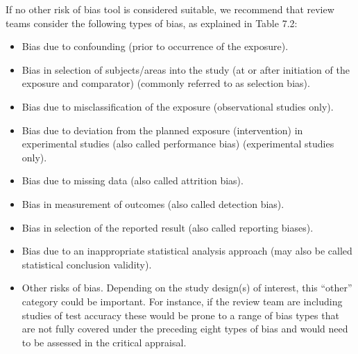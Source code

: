 \documentclass[
  letterpaper,
  DIV=11,
  numbers=noendperiod]{scrreprt}
\begin{document}
If no other risk of bias tool is considered suitable, we recommend that
review teams consider the following types of bias, as explained in Table
7.2:

\begin{itemize}
\item
  Bias due to confounding (prior to occurrence of the exposure).
\item
  Bias in selection of subjects/areas into the study (at or after
  initiation of the exposure and comparator) (commonly referred to as
  selection bias).
\item
  Bias due to misclassification of the exposure (observational studies
  only).
\item
  Bias due to deviation from the planned exposure (intervention) in
  experimental studies (also called performance bias) (experimental
  studies only).
\item
  Bias due to missing data (also called attrition bias).
\item
  Bias in measurement of outcomes (also called detection bias).
\item
  Bias in selection of the reported result (also called reporting
  biases).
\item
  Bias due to an inappropriate statistical analysis approach (may also
  be called statistical conclusion validity).
\item
  Other risks of bias. Depending on the study design(s) of interest,
  this ``other'' category could be important. For instance, if the
  review team are including studies of test accuracy these would be
  prone to a range of bias types that are not fully covered under the
  preceding eight types of bias and would need to be assessed in the
  critical appraisal.
\end{itemize}
\end{document}
